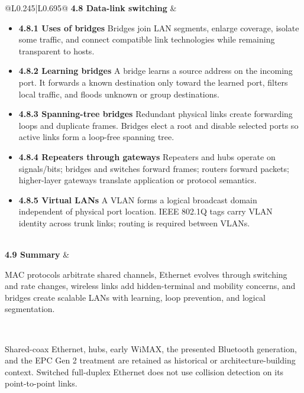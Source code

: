\documentclass[10pt,letterpaper]{article}
\begin{document}
\begin{longtable}{@{}L{0.245\textwidth}|L{0.695\textwidth}@{}}
\textbf{4.8 Data-link switching} & \begin{minipage}[t]{\linewidth}\raggedright \begin{itemize}\item \textbf{4.8.1 Uses of bridges} Bridges join LAN segments, enlarge coverage, isolate some traffic, and connect compatible link technologies while remaining transparent to hosts.\item \textbf{4.8.2 Learning bridges} A bridge learns a source address on the incoming port. It forwards a known destination only toward the learned port, filters local traffic, and floods unknown or group destinations.\item \textbf{4.8.3 Spanning-tree bridges} Redundant physical links create forwarding loops and duplicate frames. Bridges elect a root and disable selected ports so active links form a loop-free spanning tree.\item \textbf{4.8.4 Repeaters through gateways} Repeaters and hubs operate on signals/bits; bridges and switches forward frames; routers forward packets; higher-layer gateways translate application or protocol semantics.\item \textbf{4.8.5 Virtual LANs} A VLAN forms a logical broadcast domain independent of physical port location. IEEE 802.1Q tags carry VLAN identity across trunk links; routing is required between VLANs.\end{itemize}\end{minipage} \\ \hline
{}\textbf{4.9 Summary} & \begin{minipage}[t]{\linewidth}\raggedright MAC protocols arbitrate shared channels, Ethernet evolves through switching and rate changes, wireless links add hidden-terminal and mobility concerns, and bridges create scalable LANs with learning, loop prevention, and logical segmentation.\end{minipage} \\ \hline
\end{longtable}

\begin{legacybox}Shared-coax Ethernet, hubs, early WiMAX, the presented Bluetooth generation, and the EPC Gen 2 treatment are retained as historical or architecture-building context. Switched full-duplex Ethernet does not use collision detection on its point-to-point links.\end{legacybox}

\end{document}

